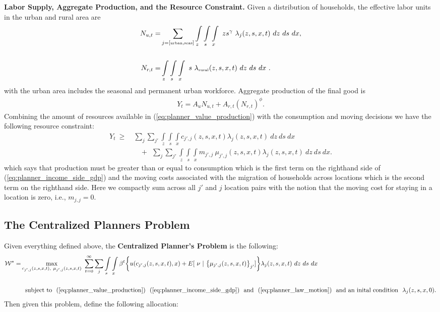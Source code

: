 \documentclass[12pt,pdftex]{article}
\begin{document}
\begin{onehalfspacing}
\textbf{Labor Supply, Aggregate Production, and the Resource Constraint.} Given a distribution of households, the effective labor units in the urban and rural area are
\begin{align}
N_{u,t} =& \sum_{j = [\mbox{\tiny urban}, \mbox{\tiny seas}]}\int\limits_{z} \int\limits_{s} \int\limits_{x} \  z s^{\gamma} \ \lambda_j(z, s, x, t) \ dz \ ds \ dx, \nonumber
\\
\nonumber \\
N_{r,t} =& \int\limits_{z} \int\limits_{s} \int\limits_{x} \ s \ \lambda_{\mbox{\tiny rural}}(z, s, x, t)\ dz \ ds \ dx \ .
\label{eq:planner_labor_supply}
\end{align}
with the urban area includes the seasonal and permanent urban workforce. Aggregate production of the final good is
\begin{align}
Y_t = A_u N_{u,t} + A_{r,t} \left(N_{r,t} \right)^{\phi}.
\label{eq:planner_value_production}
\end{align}
Combining the amount of resources available in (\ref{eq:planner_value_production}) with the consumption and moving decisions we have the following resource constraint:
\begin{align}
Y_t\  \geq \ & \sum_{j}\sum_{j'} \int\limits_{z} \int\limits_{s} \int\limits_{x} c_{j',j}(z, s, x, t) \lambda_{j}(z, s, x, t) \ dz \ ds \ dx  \nonumber \\
& \ \ \ \ +  \ \  \sum_{j}\sum_{j'} \int\limits_{z} \int\limits_{s} \int\limits_{x}  m_{j',j} \ \mu_{j',j}(z,s, x, t) \lambda_{j}(z, s, x, t) \ dz \ ds \ dx.
\label{eq:planner_income_side_gdp}
\end{align}
which says that production must be greater than or equal to consumption which is the first term on the righthand side of (\ref{eq:planner_income_side_gdp}) and the moving costs associated with the migration of households across locations which is the second term on the righthand side. Here we compactly sum across all $j'$ and $j$ location pairs with the notion that the moving cost for staying in a location is zero, i.e., $m_{j,j} = 0$.

\subsection{The Centralized Planners Problem}

Given everything defined above, the \textbf{Centralized Planner's Problem} is the following:
{\small
\begin{align}
\mathcal{W}^{*} = & \max\limits_{c_{j',j}(z, s, x, t),\ \mu_{j',j}(z, s, x, t)} \ \sum_{t=0}^{\infty}\sum_{j} \int\limits_{s} \int\limits_{x} \beta^{t} \bigg \{ u(c_{j',j}(z, s, x, t), x) + E[ \ \nu \ | \ \big\{\mu_{j',j}(z,s,x,t)\big\}_{j'}]  \bigg \} \lambda_{j}(z, s, x, t) \ dz \ ds \ dx \ \ \nonumber \\
\nonumber \\
& \ \ \mbox{subject to} \ \ (\ref{eq:planner_value_production}) \ \ (\ref{eq:planner_income_side_gdp}) \ \ \mbox{and} \ \ (\ref{eq:planner_law_motion}) \ \ \mbox{and an inital condition} \ \ \lambda_j(z, s, x,0).
\label{eq:planner_problem}
\end{align}}
Then given this problem, define the following allocation:


\end{onehalfspacing}
\end{document}
